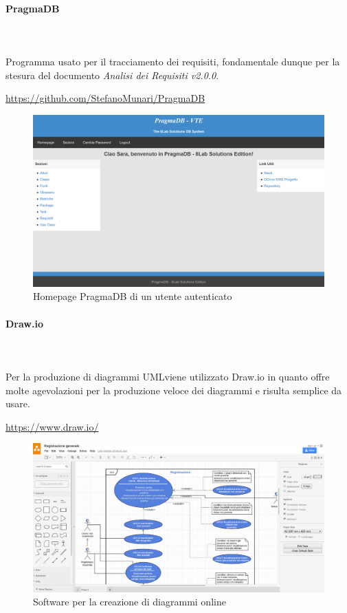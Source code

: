 		\paragraph{PragmaDB} \mbox{}\\ \mbox{}\\
		Programma usato per il tracciamento dei requisiti, fondamentale dunque per la stesura del documento \textit{Analisi dei Requisiti v2.0.0}. \newline
		\centerline{\url{https://github.com/StefanoMunari/PragmaDB}}
			\begin{figure}[H]
				\includegraphics[width=0.99\linewidth]{res/images/HomepagePragmaDB.png}
				\caption{Homepage PragmaDB di un utente autenticato}
			\end{figure}

		\paragraph{Draw.io} \mbox{}\\ \mbox{}\\
		Per la produzione di diagrammi UML\glosp viene utilizzato Draw.io in quanto 
		offre molte agevolazioni per la produzione veloce dei diagrammi e risulta 
		semplice da usare. \newline
		\centerline{\url{https://www.draw.io/}}
			\begin{figure}[H]
				\includegraphics[width=0.99\linewidth]{res/images/drawio.jpg}
				\caption{Software per la creazione di diagrammi online}
			\end{figure} 
				
